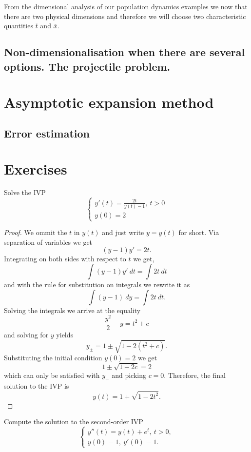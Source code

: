 From the dimensional analysis of our population dynamics examples we now that
there are two physical dimensions and therefore we will choose two
characteristic quantities $\overline{t}$ and $\overline{x}$.

\subsection{Non-dimensionalisation when there are several options. The
projectile problem.}

\section{Asymptotic expansion method}

\subsection{Error estimation}

\section{Exercises}

\begin{ex}

  Solve the IVP
  \[
  \begin{cases}
    y'(t) = \frac{2t}{y(t) - 1} ,\ t > 0 \\
    y(0) = 2
  \end{cases}
  \]
\end{ex}

\begin{proof}
  We ommit the $t$ in $y(t)$ and just write $y = y(t)$ for short.
  Via separation of variables we get
  \[
    (y - 1)y' = 2t. 
  \]
  Integrating on both sides with respect to $t$ we get,
  \[
    \int (y - 1) y'\ dt = \int 2t\ dt
  \]
  and with the rule for substitution on integrals we rewrite it as
  \[
    \int (y - 1)\ dy = \int 2t\ dt.
  \]
  Solving the integrals we arrive at the equality
  \[
  \frac{y^2}{2} - y = t^2 + c
  \]
  and solving for $y$ yields
  \[
    y_\pm = 1 \pm \sqrt{1 - 2(t^2 +c)}.
  \]
  Substituting the initial condition $y(0) = 2$ we get
  \[
    1 \pm \sqrt{1 - 2c} = 2
  \]
  which can only be satisfied with $y_+$ and picking $c = 0$. Therefore, the
  final solution to the IVP is
  \[
   y(t) = 1 + \sqrt{1 - 2t^2}.
  \]
\end{proof}


\begin{ex}

  Compute the solution to the second-order IVP
  \[
  \begin{cases}
    y''(t) = y(t) + e^t,\ t > 0,\\
    y(0) = 1,\ y'(0) = 1.
  \end{cases}
  \]
\end{ex}

